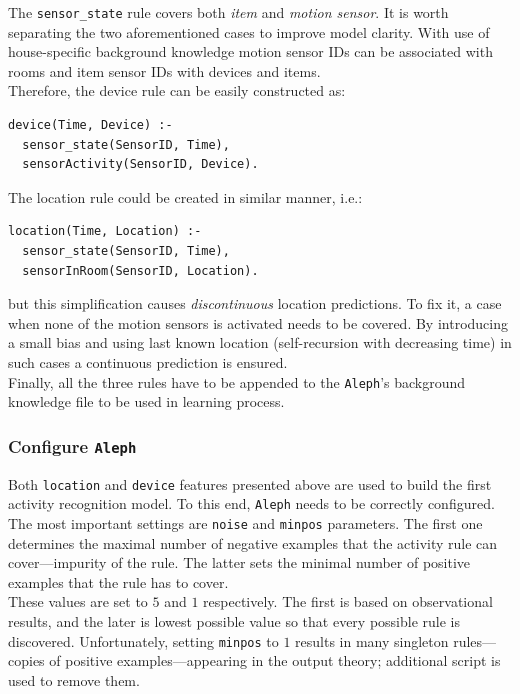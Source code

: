 \documentclass[11pt, a4paper, pdflatex, leqno, twoside, openright]{report}
\begin{document}
The \texttt{sensor\_state} rule covers both \emph{item} and \emph{motion sensor}. It is worth separating the two aforementioned cases to improve model clarity. With use of house-specific background knowledge motion sensor IDs can be associated with rooms and item sensor IDs with devices and items.\\
Therefore, the device rule can be easily constructed as:\\
\begin{verbatim}
device(Time, Device) :-
  sensor_state(SensorID, Time),
  sensorActivity(SensorID, Device).
\end{verbatim}
The location rule could be created in similar manner, i.e.:\\
\begin{verbatim}
location(Time, Location) :-
  sensor_state(SensorID, Time),
  sensorInRoom(SensorID, Location).
\end{verbatim}
but this simplification causes \emph{discontinuous} location predictions. To fix it, a case when none of the motion sensors is activated needs to be covered. By introducing a small bias and using last known location (self-recursion with decreasing time) in such cases a continuous prediction is ensured.\\

Finally, all the three rules have to be appended to the \texttt{Aleph}'s background knowledge file to be used in learning process.

      \subsubsection{Configure \texttt{Aleph}}
Both \texttt{location} and \texttt{device} features presented above are used to build the first activity recognition model. To this end, \texttt{Aleph} needs to be correctly configured.\\
The most important settings are \texttt{noise} and \texttt{minpos} parameters. The first one determines the maximal number of negative examples that the activity rule can cover---impurity of the rule. The latter sets the minimal number of positive examples that the rule has to cover.\\
These values are set to $5$ and $1$ respectively. The first is based on observational results, and the later is lowest possible value so that every possible rule is discovered. Unfortunately, setting \texttt{minpos} to $1$ results in many singleton rules---copies of positive examples---appearing in the output theory; additional script is used to remove them.\\
\end{document}
